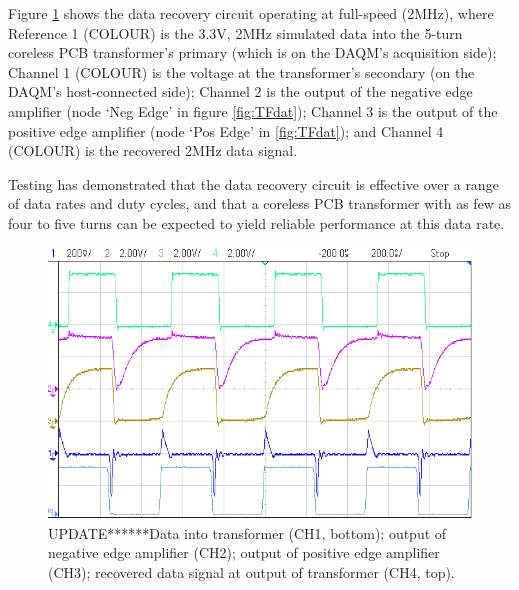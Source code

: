 \documentclass[conference]{IEEEtran}
\begin{document}
	Figure \ref{fig:Data} shows the data recovery circuit operating at full-speed (2MHz), where Reference 1 (COLOUR) is the 3.3V, 2MHz simulated data into the 5-turn coreless PCB transformer's primary (which is on the DAQM's acquisition side); Channel 1 (COLOUR) is the voltage at the transformer's secondary (on the DAQM's host-connected side); Channel 2 is the output of the negative edge amplifier (node `Neg Edge' in figure \ref{fig:TFdat}); Channel 3 is the output of the positive edge amplifier (node `Pos Edge' in \ref{fig:TFdat}); and Channel 4 (COLOUR) is the recovered 2MHz data signal.
	
	Testing has demonstrated that the data recovery circuit is effective over a range of data rates and duty cycles, and that a coreless PCB transformer with as few as four to five turns can be expected to yield reliable performance at this data rate.
	
	\begin{figure}[t]
		\centering
		\includegraphics[width=0.8\columnwidth]{./img/2M_Cropped}
		\caption{UPDATE******Data into transformer (CH1, bottom); output of negative edge amplifier (CH2); output of positive edge amplifier (CH3); recovered data signal at output of transformer (CH4, top).}
		\label{fig:Data}
	\end{figure}
\end{document}
